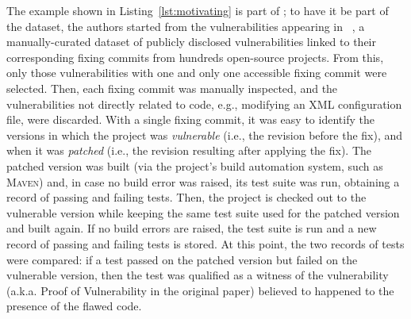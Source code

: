 The example shown in Listing~\ref{lst:motivating} is part of \VulforJ; to have it be part of the dataset, the authors started from the vulnerabilities appearing in \projectKB~\cite{ponta:msr2019:projectkb}, a manually-curated dataset of publicly disclosed vulnerabilities linked to their corresponding fixing commits from hundreds open-source \Java projects.
From this, only those vulnerabilities with one and only one accessible fixing commit were selected.
Then, each fixing commit was manually inspected, and the vulnerabilities not directly related to \Java code, e.g., modifying an XML configuration file, were discarded.
%
With a single fixing commit, it was easy to identify the versions in which the project was \textit{vulnerable} (i.e., the revision before the fix), and when it was \textit{patched} (i.e., the revision resulting after applying the fix).
The patched version was built (via the project's build automation system, such as \textsc{Maven}) and, in case no build error was raised, its test suite was run, obtaining a record of passing and failing tests.
Then, the project is checked out to the vulnerable version while keeping the same test suite used for the patched version and built again.
If no build errors are raised, the test suite is run and a new record of passing and failing tests is stored.
% 
At this point, the two records of tests were compared: if a test passed on the patched version but failed on the vulnerable version, then the test was qualified as a witness of the vulnerability (a.k.a. Proof of Vulnerability in the original paper) believed to happened to the presence of the flawed code.

